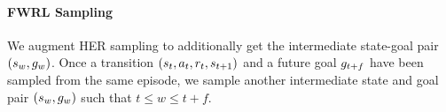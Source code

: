 \paragraph{FWRL Sampling}
We augment HER sampling to additionally get the intermediate state-goal pair
$(s_{w}, g_{w})$.
Once a transition $(s_t, a_t, r_t, s_{t+1})$ and a
future goal $g_{t+f}$ have been sampled from the same episode, we sample
another intermediate state and goal pair $(s_{w}, g_{w})$ such that
$t \le w \le t + f$.
% 



